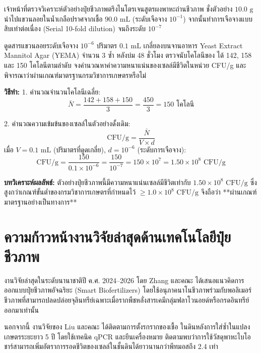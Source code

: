 \begin{worked}
เจ้าหน้าที่ตรวจวิเคราะห์ตัวอย่างปุ๋ยชีวภาพตรึงไนโตรเจนสูตรผงพาหะถ่านชีวภาพ ชั่งตัวอย่าง $10.0\text{ g}$ นำไปแขวนลอยในน้ำเกลือปราศจากเชื้อ $90.0\text{ mL}$ (ระดับเจือจาง $10^{-1}$) จากนั้นทำการเจือจางแบบสิบเท่าต่อเนื่อง (Serial 10-fold dilution) จนถึงระดับ $10^{-7}$ 

ดูดสารแขวนลอยระดับเจือจาง $10^{-6}$ ปริมาตร $0.1\text{ mL}$ เกลี่ยลงบนจานอาหาร Yeast Extract Mannitol Agar (YEMA) จำนวน 3 ซ้ำ หลังบ่ม 48 ชั่วโมง ตรวจนับโคโลนีของ  ได้ 142, 158 และ 150 โคโลนีตามลำดับ จงคำนวณหาค่าความหนาแน่นของเซลล์มีชีวิตในหน่วย CFU/g และพิจารณาว่าผ่านเกณฑ์มาตรฐานกรมวิชาการเกษตรหรือไม่

\textbf{วิธีทำ:}
1. คำนวณจำนวนโคโลนีเฉลี่ย:
$$\bar{N} = \frac{142 + 158 + 150}{3} = \frac{450}{3} = 150\text{ โคโลนี}$$

2. คำนวณความเข้มข้นของเซลล์ในตัวอย่างดั้งเดิม:
$$\text{CFU/g} = \frac{\bar{N}}{V \times d}$$
เมื่อ $V = 0.1\text{ mL}$ (ปริมาตรที่ดูดเกลี่ย), $d = 10^{-6}$ (ระดับการเจือจาง):
$$\text{CFU/g} = \frac{150}{0.1 \times 10^{-6}} = \frac{150}{10^{-7}} = 150 \times 10^7 = 1.50 \times 10^8\text{ CFU/g}$$

\textbf{บทวิเคราะห์ผลลัพธ์:} ตัวอย่างปุ๋ยชีวภาพนี้มีความหนาแน่นเซลล์มีชีวิตเท่ากับ $1.50 \times 10^8\text{ CFU/g}$ ซึ่งสูงกว่าเกณฑ์ขั้นต่ำของกรมวิชาการเกษตรที่กำหนดไว้ $\ge 1.0 \times 10^8\text{ CFU/g}$ จึงถือว่า **ผ่านเกณฑ์มาตรฐานอย่างเป็นทางการ**
\end{worked}

\section{ความก้าวหน้างานวิจัยล่าสุดด้านเทคโนโลยีปุ๋ยชีวภาพ}

งานวิจัยล่าสุดในระดับนานาชาติปี ค.ศ. 2024–2026 โดย Zhang และคณะ \cite{pmid39176279} ได้เสนอแนวคิดการออกแบบปุ๋ยชีวภาพอัจฉริยะ (Smart Biofertilizers) โดยใช้อนุภาคนาโนชีวภาพร่วมกับพอลิเมอร์ชีวภาพที่สามารถปลดปล่อยจุลินทรีย์เฉพาะเมื่อรากพืชหลั่งสารเคมีกลุ่มฟลาโวนอยด์หรือกรดอินทรีย์ออกมาเท่านั้น 

นอกจากนี้ งานวิจัยของ Liu และคณะ \cite{pmid38378706} ได้ติดตามการตั้งรกรากของเชื้อ  ในดินหลังการใส่ซ้ำในแปลงเกษตรระยะยาว 5 ปี โดยใช้เทคนิค qPCR และยีนเครื่องหมาย ติดตามพบว่าการใช้วัสดุพาหะไบโอชาร์สามารถเพิ่มอัตราการรอดชีวิตของเซลล์ในชั้นดินได้ยาวนานกว่าพีทมอสถึง 2.4 เท่า

